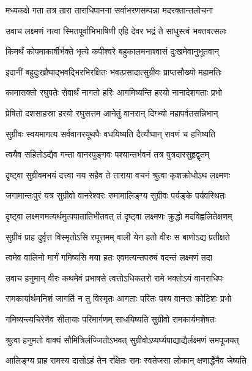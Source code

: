 \twolineshloka
{मध्यकक्षे गता तत्र तारा ताराधिपानना}
{सर्वाभरणसम्पन्ना मदरक्तान्तलोचना} %

\twolineshloka
{उवाच लक्ष्मणं नत्वा स्मितपूर्वाभिभाषिणी}
{एहि देवर भद्रं ते साधुस्त्वं भक्तवत्सलः} %

\twolineshloka
{किमर्थं कोपमाकार्षीर्भक्ते भृत्ये कपीश्वरे}
{बहुकालमनाश्वासं दुःखमेवानुभूतवान्} %

\twolineshloka
{इदानीं बहुदुःखौघाद्भवद्भिरभिरक्षितः}
{भवत्प्रसादात्सुग्रीवः प्राप्तसौख्यो महामतिः} %

\twolineshloka
{कामासक्तो रघुपतेः सेवार्थं नागतो हरिः}
{आगमिष्यन्ति हरयो नानादेशगताः प्रभो} %

\twolineshloka
{प्रेषितो दशसाहस्रा हरयो रघुसत्तम}
{आनेतुं वानरान् दिग्भ्यो महापर्वतसन्निभान्} %

\twolineshloka
{सुग्रीवः स्वयमागत्य सर्ववानरयूथपैः}
{वधयिष्यति दैत्यौघान् रावणं च हनिष्यति} %

\twolineshloka
{त्वयैव सहितोऽद्यैव गन्ता वानरपुङ्गवः}
{पश्यान्तर्भवनं तत्र पुत्रदारसुहृद्वृतम्} %

\twolineshloka
{दृष्ट्वा सुग्रीवमभयं दत्त्वा नय सहैव ते}
{ताराया वचनं श्रुत्वा कृशक्रोधोऽथ लक्ष्मणः} %

\twolineshloka
{जगामान्तःपुरं यत्र सुग्रीवो वानरेश्वरः}
{रुमामालिङ्ग्य सुग्रीवः पर्यङ्के पर्यवस्थितः} %

\twolineshloka
{दृष्ट्वा लक्ष्मणमत्यर्थमुत्पपातातिभीतवत्}
{तं दृष्ट्वा लक्ष्मणः क्रुद्धो मदविह्वलितेक्षणम्} %

\twolineshloka
{सुग्रीवं प्राह दुर्वृत्त विस्मृतोऽसि रघूत्तमम्}
{वाली येन हतो वीरः स बाणोऽद्य प्रतीक्षते} %

\twolineshloka
{त्वमेव वालिनो मार्गं गमिष्यसि मया हतः}
{एवमत्यन्तपरुषं वदन्तं लक्ष्मणं तदा} %

\twolineshloka
{उवाच हनुमान् वीरः कथमेवं प्रभाषसे}
{त्वत्तोऽधिकतरो रामे भक्तोऽयं वानराधिपः} %

\twolineshloka
{रामकार्यार्थमनिशं जागर्ति न तु विस्मृतः}
{आगताः परितः पश्य वानराः कोटिशः प्रभो} %

\twolineshloka
{गमिष्यन्त्यचिरेणैव सीतायाः परिमार्गणम्}
{साधयिष्यति सुग्रीवो रामकार्यमशेषतः} %

\twolineshloka
{श्रुत्वा हनुमतो वाक्यं सौमित्रिर्लज्जितोऽभवत्}
{सुग्रीवोऽप्यर्घ्यपाद्याद्यैर्लक्ष्मणं समपूजयत्} %

\twolineshloka
{आलिङ्ग्य प्राह रामस्य दासोऽहं तेन रक्षितः}
{रामः स्वतेजसा लोकान् क्षणार्द्धेनैव जेष्यति} %

